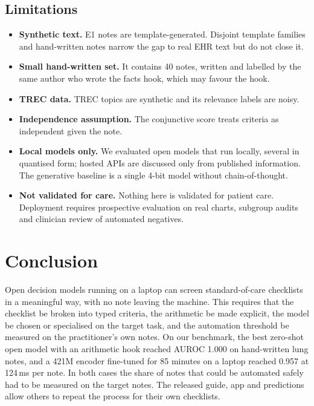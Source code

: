 \documentclass[11pt]{article}
\begin{document}
\subsection{Limitations}
\begin{itemize}[nosep]
\item \textbf{Synthetic text.} E1 notes are template-generated. Disjoint template families and hand-written notes narrow the gap to real EHR text but do not close it.
\item \textbf{Small hand-written set.} It contains 40 notes, written and labelled by the same author who wrote the facts hook, which may favour the hook.
\item \textbf{TREC data.} TREC topics are synthetic and its relevance labels are noisy.
\item \textbf{Independence assumption.} The conjunctive score treats criteria as independent given the note.
\item \textbf{Local models only.} We evaluated open models that run locally, several in quantised form; hosted APIs are discussed only from published information. The generative baseline is a single 4-bit model without chain-of-thought.
\item \textbf{Not validated for care.} Nothing here is validated for patient care. Deployment requires prospective evaluation on real charts, subgroup audits and clinician review of automated negatives.
\end{itemize}

\section{Conclusion}
Open decision models running on a laptop can screen standard-of-care checklists in a meaningful way, with no note leaving the machine.
This requires that the checklist be broken into typed criteria, the arithmetic be made explicit, the model be chosen or specialised on the target task, and the automation threshold be measured on the practitioner's own notes.
On our benchmark, the best zero-shot open model with an arithmetic hook reached AUROC 1.000 on hand-written lung notes, and a 421M encoder fine-tuned for 85 minutes on a laptop reached 0.957 at 124\,ms per note. In both cases the share of notes that could be automated safely had to be measured on the target notes.
The released guide, app and predictions allow others to repeat the process for their own checklists.
\end{document}
